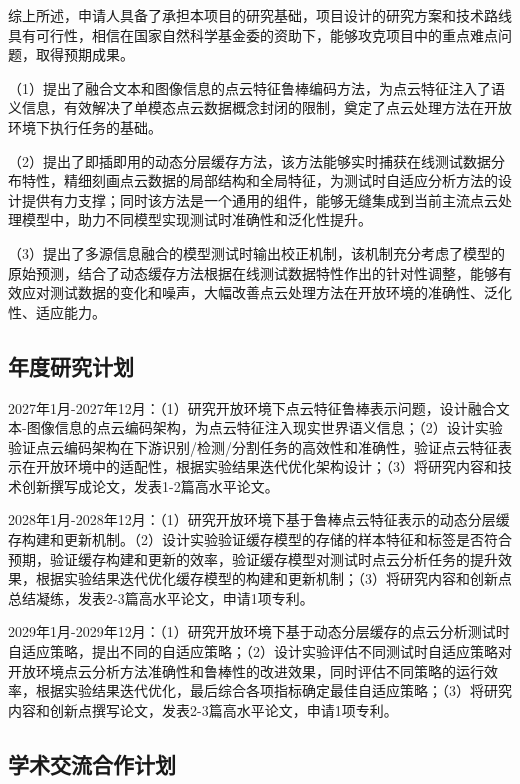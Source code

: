 \documentclass[12pt]{article}
\begin{document}
综上所述，申请人具备了承担本项目的研究基础，项目设计的研究方案和技术路线具有可行性，相信在国家自然科学基金委的资助下，能够攻克项目中的重点难点问题，取得预期成果。


（1）提出了融合文本和图像信息的点云特征鲁棒编码方法，为点云特征注入了语义信息，有效解决了单模态点云数据概念封闭的限制，奠定了点云处理方法在开放环境下执行任务的基础。

（2）提出了即插即用的动态分层缓存方法，该方法能够实时捕获在线测试数据分布特性，精细刻画点云数据的局部结构和全局特征，为测试时自适应分析方法的设计提供有力支撑；同时该方法是一个通用的组件，能够无缝集成到当前主流点云处理模型中，助力不同模型实现测试时准确性和泛化性提升。

（3）提出了多源信息融合的模型测试时输出校正机制，该机制充分考虑了模型的原始预测，结合了动态缓存方法根据在线测试数据特性作出的针对性调整，能够有效应对测试数据的变化和噪声，大幅改善点云处理方法在开放环境的准确性、泛化性、适应能力。


\subsection{年度研究计划}
2027年1月-2027年12月：（1）研究开放环境下点云特征鲁棒表示问题，设计融合文本-图像信息的点云编码架构，为点云特征注入现实世界语义信息；（2）设计实验验证点云编码架构在下游识别/检测/分割任务的高效性和准确性，验证点云特征表示在开放环境中的适配性，根据实验结果迭代优化架构设计；（3）将研究内容和技术创新撰写成论文，发表1-2篇高水平论文。

2028年1月-2028年12月：（1）研究开放环境下基于鲁棒点云特征表示的动态分层缓存构建和更新机制。（2）设计实验验证缓存模型的存储的样本特征和标签是否符合预期，验证缓存构建和更新的效率，验证缓存模型对测试时点云分析任务的提升效果，根据实验结果迭代优化缓存模型的构建和更新机制；（3）将研究内容和创新点总结凝练，发表2-3篇高水平论文，申请1项专利。

2029年1月-2029年12月：（1）研究开放环境下基于动态分层缓存的点云分析测试时自适应策略，提出不同的自适应策略；（2）设计实验评估不同测试时自适应策略对开放环境点云分析方法准确性和鲁棒性的改进效果，同时评估不同策略的运行效率，根据实验结果迭代优化，最后综合各项指标确定最佳自适应策略；（3）将研究内容和创新点撰写论文，发表2-3篇高水平论文，申请1项专利。

\subsection{学术交流合作计划}
\end{document}

